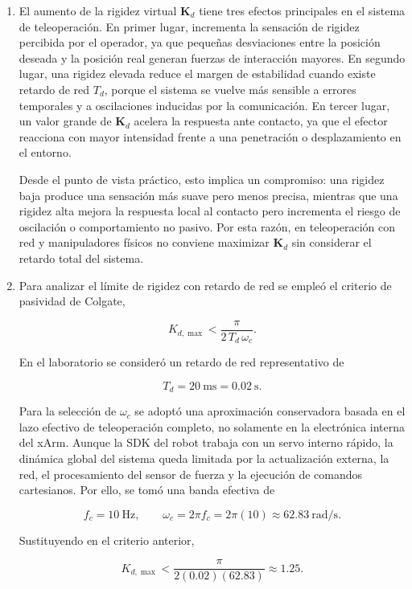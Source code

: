 \documentclass[journal,10pt,twoside]{IEEEtran}
\begin{document}
\begin{enumerate}[label=(\alph*)]

\item El aumento de la rigidez virtual $\bm{K}_d$ tiene tres efectos
principales en el sistema de teleoperación. En primer lugar,
incrementa la sensación de rigidez percibida por el operador, ya
que pequeñas desviaciones entre la posición deseada y la posición
real generan fuerzas de interacción mayores. En segundo lugar,
una rigidez elevada reduce el margen de estabilidad cuando existe
retardo de red $T_d$, porque el sistema se vuelve más sensible a
errores temporales y a oscilaciones inducidas por la comunicación.
En tercer lugar, un valor grande de $\bm{K}_d$ acelera la respuesta
ante contacto, ya que el efector reacciona con mayor intensidad
frente a una penetración o desplazamiento en el entorno.

Desde el punto de vista práctico, esto implica un compromiso: una
rigidez baja produce una sensación más suave pero menos precisa,
mientras que una rigidez alta mejora la respuesta local al contacto
pero incrementa el riesgo de oscilación o comportamiento no pasivo.
Por esta razón, en teleoperación con red y manipuladores físicos no
conviene maximizar $\bm{K}_d$ sin considerar el retardo total del
sistema.

\item Para analizar el límite de rigidez con retardo de red se empleó
el criterio de pasividad de Colgate,

\[
K_{d,\max}
<
\frac{\pi}{2\,T_d\,\omega_c}.
\]

En el laboratorio se consideró un retardo de red representativo de

\[
T_d = 20~\text{ms} = 0.02~\text{s}.
\]

Para la selección de $\omega_c$ se adoptó una aproximación
conservadora basada en el lazo efectivo de teleoperación completo,
no solamente en la electrónica interna del xArm. Aunque la SDK del
robot trabaja con un servo interno rápido, la dinámica global del
sistema queda limitada por la actualización externa, la red, el
procesamiento del sensor de fuerza y la ejecución de comandos
cartesianos. Por ello, se tomó una banda efectiva de

\[
f_c = 10~\text{Hz},
\qquad
\omega_c = 2\pi f_c = 2\pi(10) \approx 62.83~\text{rad/s}.
\]

Sustituyendo en el criterio anterior,

\[
K_{d,\max}
<
\frac{\pi}{2(0.02)(62.83)}
\approx 1.25.
\]


\end{enumerate}
\end{document}
